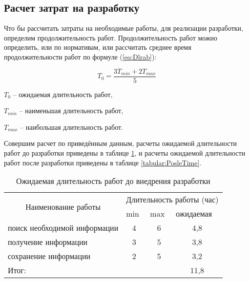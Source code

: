\subsection{Расчет затрат на разработку}
Что бы рассчитать затраты на необходимые работы, для реализации разработки, определим продолжительность работ.
Продолжительность работ можно определить, или по нормативам, или рассчитать среднее время продолжительности работ по формуле (\ref{eq:Dlrab}):

\begin{equation}\label{eq:Dlrab}
T_{0} = \frac{3T_{min} + 2T_{max}}{5}
\end{equation}

$T_{0}$ -- ожидаемая длительность работ,

$T_{min}$ -- наименьшая длительность работ,

$T_{max}$ -- наибольшая длительность работ.

Совершим расчет по приведённым данным, расчеты ожидаемой длительности работ до разработки  приведены в таблице \ref{tabular:DoTime}, и расчеты ожидаемой длительности работ после разработки приведены в таблице \ref{tabular:PosleTime}.

\begin{table}[H]
\caption{Ожидаемая длительность работ до внедрения разработки }
\label{tabular:DoTime}
\begin{center}
\begin{tabular}{|l|c|c|c|}
\hline
\multicolumn{1}{|c|}{\multirow{2}{*}{Наименование работы}} & \multicolumn{3}{c|}{Длительность работы (час)}                                       \\ \cline{2-4} 
\multicolumn{1}{|c|}{}                                     & \multicolumn{1}{l|}{min} & \multicolumn{1}{l|}{max} & \multicolumn{1}{l|}{ожидаемая} \\ \hline
поиск необходимой информации                               & 4                        & 6                        & 4,8                              \\ \hline
получение информации                                       & 3                        & 5                        & 3,8                              \\ \hline
сохранение информации                                      & 2                        & 5                        & 3,2                              \\ \hline
\multicolumn{3}{|l|}{Итог:}                                                                                      & 11,8                               \\ \hline
\end{tabular}
\end{center}
\end{table}

